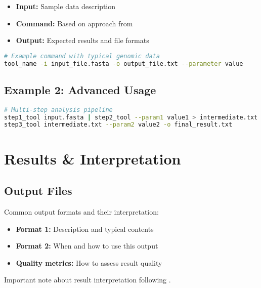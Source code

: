 \documentclass[a4paper,11pt]{article}
\begin{document}
\begin{itemize}
    \item \textbf{Input:} Sample data description
    \item \textbf{Command:} Based on approach from \cite{example2024}
    \item \textbf{Output:} Expected results and file formats
\end{itemize}

\begin{lstlisting}[language=bash, caption=Basic command example]
# Example command with typical genomic data
tool_name -i input_file.fasta -o output_file.txt --parameter value
\end{lstlisting}

\subsection{Example 2: Advanced Usage}

\begin{lstlisting}[language=bash, caption=Advanced analysis pipeline]
# Multi-step analysis pipeline
step1_tool input.fasta | step2_tool --param1 value1 > intermediate.txt
step3_tool intermediate.txt --param2 value2 -o final_result.txt
\end{lstlisting}

\section{Results \& Interpretation}

\subsection{Output Files}

Common output formats and their interpretation:
\begin{itemize}
    \item \textbf{Format 1:} Description and typical contents
    \item \textbf{Format 2:} When and how to use this output
    \item \textbf{Quality metrics:} How to assess result quality
\end{itemize}

\begin{remark}
Important note about result interpretation following \citet{author2024}.
\end{remark}
\end{document}
